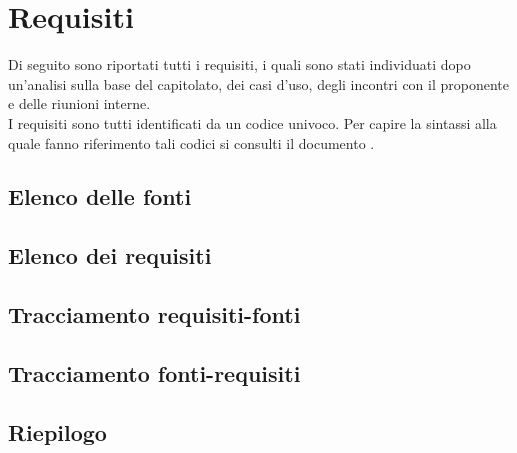 \section{Requisiti}

Di seguito sono riportati tutti i requisiti, i quali sono stati individuati dopo un'analisi sulla base del capitolato, dei casi d'uso, degli incontri con il proponente e delle riunioni interne.\\
I requisiti sono tutti identificati da un codice univoco. Per capire la sintassi alla quale fanno riferimento tali codici si consulti il documento .
\subsection{Elenco delle fonti}

\subsection{Elenco dei requisiti}

\subsection{Tracciamento requisiti-fonti}

\subsection{Tracciamento fonti-requisiti}

\subsection{Riepilogo}
